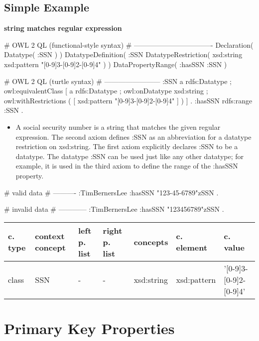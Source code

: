 \documentclass{llncs}
\newenvironment{gcotable}{
  \scriptsize
  \sffamily
  \vspace{0.3cm}
  \begin{tabular}{l|l|l|l|l|l|l}
  \hline
  \textbf{c. type} & \textbf{context concept} & \textbf{left p. list} & \textbf{right p. list} & \textbf{concepts} & \textbf{c. element} & \textbf{c. value} \\
  \hline

}{
  \hline
  \end{tabular}
  \linebreak
}
\begin{document}
\subsection{Simple Example}

\textbf{string matches regular expression}

\begin{ex}
# OWL 2 QL (functional-style syntax)
# ----------------------------------
Declaration( Datatype( :SSN ) ) 
DatatypeDefinition( 
    :SSN
    DatatypeRestriction( xsd:string xsd:pattern "[0-9]{3}-[0-9]{2}-[0-9]{4}" ) )     
DataPropertyRange( :hasSSN :SSN ) 
\end{ex}

\begin{ex}
# OWL 2 QL (turtle syntax)
# ------------------------
:SSN 
    a rdfs:Datatype ;
    owl:equivalentClass [
        a rdfs:Datatype ;
        owl:onDatatype xsd:string ;
        owl:withRestrictions ( 
            [ xsd:pattern "[0-9]{3}-[0-9]{2}-[0-9]{4}" ] ) ] .
:hasSSN rdfs:range :SSN .
\end{ex}

\begin{itemize}
	\item A social security number is a string that matches the given regular expression. 
The second axiom defines :SSN as an abbreviation for a datatype restriction on xsd:string. 
The first axiom explicitly declares :SSN to be a datatype. 
The datatype :SSN can be used just like any other datatype; 
for example, it is used in the third axiom to define the range of the :hasSSN property. 
\end{itemize}

\begin{ex}
# valid data
# ----------
:TimBernersLee
    :hasSSN "123-45-6789"^^:SSN .
\end{ex}

\begin{ex}
# invalid data
# ------------
:TimBernersLee
    :hasSSN "123456789"^^:SSN .
\end{ex}

\begin{gcotable}
class & SSN & - & - & xsd:string & xsd:pattern & '[0-9]{3}-[0-9]{2}-[0-9]{4}' \\
\end{gcotable}

\section{Primary Key Properties}
\end{document}
